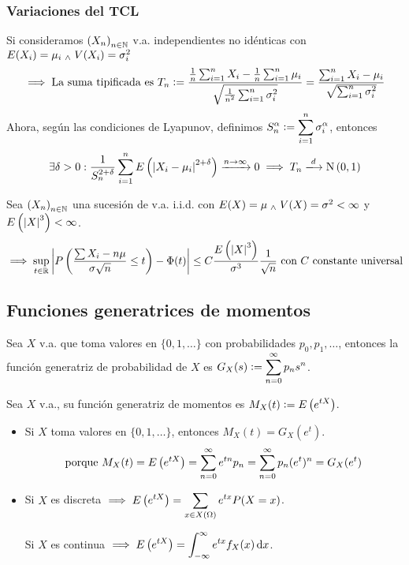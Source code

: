 
\subsubsection{Variaciones del TCL}

Si consideramos $\left(X_n\right)_{n\in \mathbb{N}}$ v.a. independientes no idénticas con $E(X_i) = \mu_i \; _{\wedge} \; V(X_i) = \sigma_i^2$
\[\implies \text{La suma tipificada es } T_n \vcentcolon= \frac{\frac{1}{n} \sum_{i=1}^{n} X_i - \frac{1}{n}\sum_{i=1}^{n} \mu_i}{\sqrt{\frac{1}{n^2}\sum_{i=1}^{n} \sigma_i^2}} = \frac{\sum_{i=1}^{n} X_i - \mu_i}{\sqrt{\sum_{i=1}^{n} \sigma_i^2}}\]
Ahora, según las condiciones de Lyapunov, definimos $\displaystyle S_n^\alpha \vcentcolon= \sum_{i=1}^{n} \sigma_i^\alpha$, entonces
\[\exists \delta > 0 : \frac{1}{S_n^{2+\delta}} \sum_{i=1}^{n} E\left(\abs{X_i - \mu_i}^{2+\delta}\right) \xrightarrow{n\to\infty} 0 \implies T_n \xlongrightarrow{d} \normal{0,1}\]

\begin{teo}
	Sea $\left(X_n\right)_{n\in \mathbb{N}}$ una sucesión de v.a. i.i.d. con $E(X) = \mu \; _{\wedge} \; V(X) = \sigma^2 < \infty$ y $E\left(\left|X\right|^3\right) < \infty$.
	\[\implies \sup_{t\in \mathbb{R}} \left|P\left(\frac{\sum X_i - n\mu}{\sigma \sqrt{n}} \leq t\right) - \Phi(t)\right| \leq C \frac{E\left(\left|X\right|^3\right)}{\sigma^3}\frac{1}{\sqrt{n}} \text{ con } C \text{ constante universal}\]
\end{teo}

\subsection{Funciones generatrices de momentos}

 Sea $X$ v.a. que toma valores en $\{0, 1, \dots\}$ con probabilidades $p_0, p_1, \dots$, entonces la función generatriz de probabilidad de $X$ es $\displaystyle G_X(s) \vcentcolon= \sum_{n=0}^{\infty} p_n s^n$. %

\begin{defn}
	Sea $X$ v.a., su función generatriz de momentos  es $\displaystyle M_X(t) \vcentcolon= E\left(e^{tX}\right)$.
\end{defn}

\begin{obs}
	\begin{itemize}
		\item Si $X$ toma valores en $\{0, 1, \dots\}$, entonces $M_X(t) = G_X(e^t)$.
		      \[\text{porque }M_X(t) = E\left(e^{tX}\right) = \sum_{n=0}^{\infty} e^{tn}p_n = \sum_{n=0}^{\infty} p_n (e^t)^n = G_X(e^t)\]
		\item Si $X$ es discreta $\displaystyle \implies E\left(e^{tX}\right) = \sum_{x \in X(\Omega)} e^{tx}P(X=x)$.

		      Si $X$ es continua $\ds \implies E\left(e^{tX}\right) = \int_{-\infty}^{\infty} e^{tx}f_X(x)\odif{x}$.
	\end{itemize}
\end{obs}

